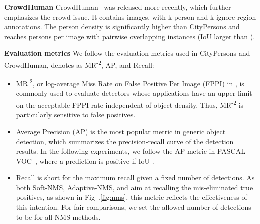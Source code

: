 \documentclass[sigconf]{acmart}
\begin{document}
\textbf{CrowdHuman} CrowdHuman~\cite{crowdhuman} was released more recently, which further emphasizes the crowd issue. It contains  images, with k person and k ignore region annotations. The person density is significantly higher than CityPersons and reaches  persons per image with  pairwise overlapping instances (IoU larger than ).

\textbf{Evaluation metrics} We follow the evaluation metrics used in CityPersons and CrowdHuman, denotes as MR\textsuperscript{-2}, AP, and Recall:
\begin{itemize}
    \item MR\textsuperscript{-2}, or log-average Miss Rate on False Positive Per Image (FPPI) in , is commonly used to evaluate detectors whose applications have an upper limit on the acceptable FPPI rate independent of object density. Thus, MR\textsuperscript{-2} is particularly sensitive to false positives. 
    \item Average Precision (AP) is the most popular metric in generic object detection, which summarizes the precision-recall curve of the detection results. In the following experiments, we follow the AP metric in PASCAL VOC~\cite{pascal}, where a prediction is positive if IoU .
    \item Recall is short for the maximum recall given a fixed number of detections. As both Soft-NMS, Adaptive-NMS, and \nmsname{} aim at recalling the mis-eliminated true positives, as shown in Fig~.\ref{fig:nms}, this metric reflects the effectiveness of this intention. For fair comparisons, we set the allowed number of detections to be  for all NMS methods.
\end{itemize}
\end{document}
